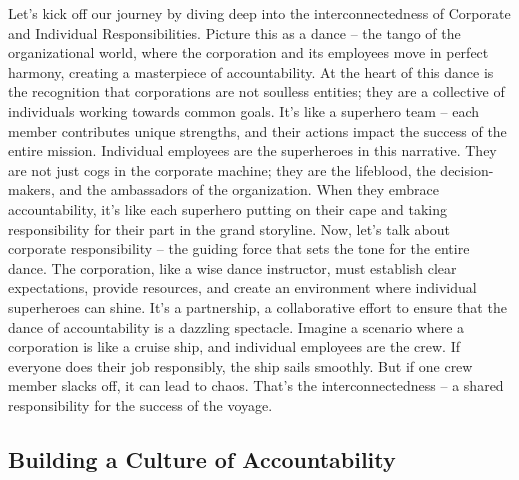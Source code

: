 \documentclass[
  letterpaper,
  DIV=11,
  numbers=noendperiod]{scrreprt}
\begin{document}
Let's kick off our journey by diving deep into the interconnectedness of
Corporate and Individual Responsibilities. Picture this as a dance --
the tango of the organizational world, where the corporation and its
employees move in perfect harmony, creating a masterpiece of
accountability. At the heart of this dance is the recognition that
corporations are not soulless entities; they are a collective of
individuals working towards common goals. It's like a superhero team --
each member contributes unique strengths, and their actions impact the
success of the entire mission. Individual employees are the superheroes
in this narrative. They are not just cogs in the corporate machine; they
are the lifeblood, the decision-makers, and the ambassadors of the
organization. When they embrace accountability, it's like each superhero
putting on their cape and taking responsibility for their part in the
grand storyline. Now, let's talk about corporate responsibility -- the
guiding force that sets the tone for the entire dance. The corporation,
like a wise dance instructor, must establish clear expectations, provide
resources, and create an environment where individual superheroes can
shine. It's a partnership, a collaborative effort to ensure that the
dance of accountability is a dazzling spectacle. Imagine a scenario
where a corporation is like a cruise ship, and individual employees are
the crew. If everyone does their job responsibly, the ship sails
smoothly. But if one crew member slacks off, it can lead to chaos.
That's the interconnectedness -- a shared responsibility for the success
of the voyage.

\subsection{Building a Culture of
Accountability}\label{building-a-culture-of-accountability}
\end{document}
